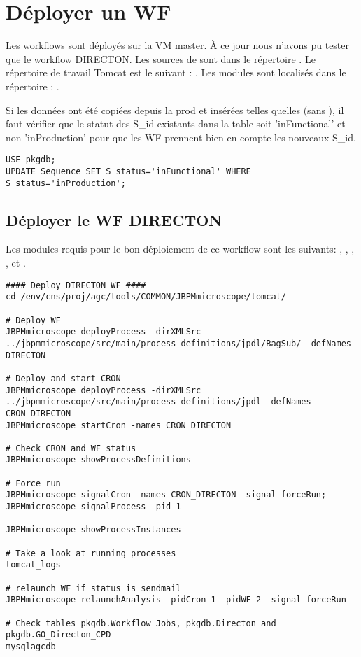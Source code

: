 \section{Déployer un WF} \label{sec:deployer_wf}

Les workflows sont déployés sur la VM master.
À ce jour nous n'avons pu tester que le workflow DIRECTON.
Les sources de  sont dans le répertoire .
Le répertoire de travail Tomcat est le suivant : .
Les modules sont localisés dans le répertoire : .

\begin{warningbox}
    Si les données ont été copiées depuis la prod et insérées telles quelles (sans ), il faut vérifier que le statut des S\_id existants dans la table  soit 'inFunctional' et non 'inProduction' pour que les WF prennent bien en compte les nouveaux S\_id.
\end{warningbox}

\begin{lstlisting}[style=SQL]
USE pkgdb;
UPDATE Sequence SET S_status='inFunctional' WHERE S_status='inProduction';
\end{lstlisting}

\subsection{Déployer le WF DIRECTON}

Les modules requis pour le bon déploiement de ce workflow sont les suivants: , , , ,  et .

\begin{lstlisting}[style=bash]
#### Deploy DIRECTON WF ####
cd /env/cns/proj/agc/tools/COMMON/JBPMmicroscope/tomcat/

# Deploy WF
JBPMmicroscope deployProcess -dirXMLSrc ../jbpmmicroscope/src/main/process-definitions/jpdl/BagSub/ -defNames DIRECTON

# Deploy and start CRON
JBPMmicroscope deployProcess -dirXMLSrc ../jbpmmicroscope/src/main/process-definitions/jpdl -defNames CRON_DIRECTON
JBPMmicroscope startCron -names CRON_DIRECTON

# Check CRON and WF status
JBPMmicroscope showProcessDefinitions

# Force run
JBPMmicroscope signalCron -names CRON_DIRECTON -signal forceRun; JBPMmicroscope signalProcess -pid 1

JBPMmicroscope showProcessInstances

# Take a look at running processes
tomcat_logs

# relaunch WF if status is sendmail
JBPMmicroscope relaunchAnalysis -pidCron 1 -pidWF 2 -signal forceRun

# Check tables pkgdb.Workflow_Jobs, pkgdb.Directon and pkgdb.GO_Directon_CPD
mysqlagcdb
\end{lstlisting}
